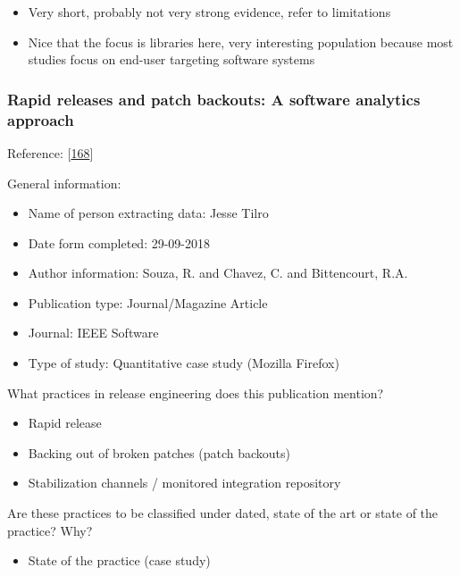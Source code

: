 \documentclass[]{book}
\providecommand{\tightlist}{%
  \setlength{\itemsep}{0pt}\setlength{\parskip}{0pt}}
\begin{document}
\begin{itemize}
\tightlist
\item
  Very short, probably not very strong evidence, refer to limitations
\item
  Nice that the focus is libraries here, very interesting population
  because most studies focus on end-user targeting software systems
\end{itemize}

\subsubsection{Rapid releases and patch backouts: A software analytics
approach}\label{rapid-releases-and-patch-backouts-a-software-analytics-approach}

Reference: {[}\protect\hyperlink{ref-souza2015a}{168}{]}

General information:

\begin{itemize}
\tightlist
\item
  Name of person extracting data: Jesse Tilro
\item
  Date form completed: 29-09-2018
\item
  Author information: Souza, R. and Chavez, C. and Bittencourt, R.A.
\item
  Publication type: Journal/Magazine Article
\item
  Journal: IEEE Software
\item
  Type of study: Quantitative case study (Mozilla Firefox)
\end{itemize}

What practices in release engineering does this publication mention?

\begin{itemize}
\tightlist
\item
  Rapid release
\item
  Backing out of broken patches (patch backouts)
\item
  Stabilization channels / monitored integration repository
\end{itemize}

Are these practices to be classified under dated, state of the art or
state of the practice? Why?

\begin{itemize}
\tightlist
\item
  State of the practice (case study)
\end{itemize}
\end{document}

